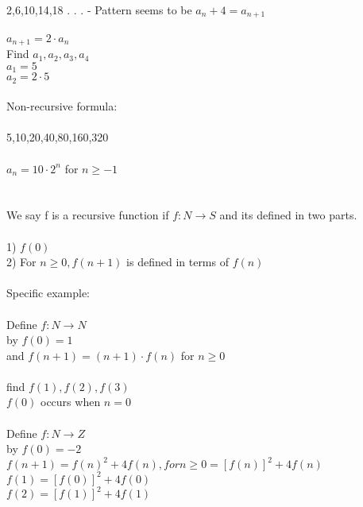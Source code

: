 \documentclass{article}
\begin{document}
\begin{flushleft}
~\\
2,6,10,14,18 . . . - Pattern seems to be $a_n + 4 = a_{n+1}$ \\
~\\
$a_{n+1} = 2\cdot a_n$\\
Find $a_1,a_2,a_3,a_4$ \\
$a_1 =5$ \\
$a_2 = 2 \cdot 5 $ \\
~\\
Non-recursive formula: \\
~\\
5,10,20,40,80,160,320 \\
~\\
$a_n = 10 \cdot 2^n$ for $n \geq -1$ \\
~\\
~\\

We say f is a recursive function if $f : N \rightarrow S$ and its defined in two parts. \\
~\\
1) $f(0)$ \\
2) For $n \geq 0, f(n+1)$ is defined in terms of $f(n)$ \\
~\\
Specific example: \\ 
~\\
Define $f: N \rightarrow N$ \\
by $f(0) = 1$ \\ 
and $f(n+1) = (n+1) \cdot f(n) $ for $n \geq 0$ \\
~\\
find $f(1), f(2), f(3)$ \\
$f(0)$ occurs when $n = 0$ \\
~\\
Define $f : N \rightarrow Z$ \\
by $f(0) = -2$ \\
$f(n+1) = f(n)^2 + 4f(n), for n \geq 0 = [f(n)]^2 + 4f(n)$  \\
$f(1) = [f(0)]^2 + 4f(0)$\\
$f(2) = [f(1)]^2 + 4f(1)$\\

\end{flushleft}
\end{document}
